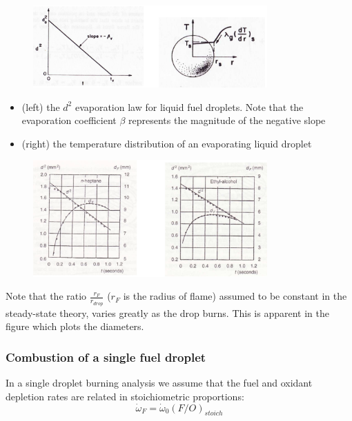 \documentclass[12pt]{article}
\begin{document}
\begin{figure}[!ht]
\centering
\includegraphics[width=0.8\textwidth]{figures/droprate.png}
\end{figure}

\begin{itemize}
    \item (left) the $d^{2}$ evaporation law for liquid fuel droplets. Note that the evaporation coefficient $\beta$ represents the magnitude of the negative slope
    \item (right) the temperature distribution of an evaporating liquid droplet
\end{itemize}

\begin{figure}[!ht]
\centering
\includegraphics[width=0.8\textwidth]{figures/flamediameter.png}
\end{figure}

Note that the ratio $\frac{r_{F}}{r_{drop}}$ ($r_{F}$ is the radius of flame) assumed to be constant in the steady-state theory, varies greatly as the drop burns. This is apparent in the figure which plots the diameters.

\subsubsection{Combustion of a single fuel droplet}

In a single droplet burning analysis we assume that the fuel and oxidant depletion rates are related in stoichiometric proportions:
\begin{equation}
    \dot{\omega}_{F} = \dot{\omega}_{0}(F/O)_{stoich}
\end{equation}
\end{document}
